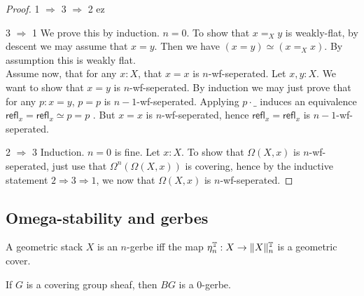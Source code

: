 \documentclass{article}
\newcommand{\refl}{\mathsf{refl}}
\begin{document}
\begin{proof}
	
	\item [1 $\Rightarrow$ 3 $\Rightarrow$ 2] ez

	\item [3 $\Rightarrow$ 1] We prove this by induction. $n = 0$. To show that $x =_{X} y$ is weakly-flat, by descent we may assume that $x = y$. Then we have $(x = y) \simeq (x =_{X} x)$. By assumption this is weakly flat. \\
	Assume now, that for any $x : X$, that $x = x$ is $n$-wf-seperated. Let $x, y : X$. We want to show that $x = y$ is $n$-wf-seperated. By induction we may just prove that for any $p : x = y$, $p = p$ is $n-1$-wf-seperated. Applying $p \cdot \_$ induces an equivalence $\refl_x = \refl_x \simeq p = p$ . But $x = x$ is $n$-wf-seperated, hence $\refl_x = \refl_x$ is $n-1$-wf-seperated.
	\item [2 $\Rightarrow$ 3] Induction. $n=0$ is fine. 
	Let $x : X$. To show that $\Omega(X,x)$ is $n$-wf-seperated, just use that $\Omega^n(\Omega(X,x))$ is covering, hence by the inductive statement $2 \Rightarrow 3 \Rightarrow 1$, we now that $\Omega(X,x)$ is $n$-wf-seperated.
\end{proof}
\subsection{Omega-stability and gerbes}
\begin{definition}
	A geometric stack $X$ is an $n$-gerbe iff the map $\eta_n^{\mathbb{T}} : X \to \|X\|_n^{\mathbb{T}}$ is a geometric cover.
\end{definition}
\begin{example}
	If $G$ is a covering group sheaf, then $BG$ is a 0-gerbe.
\end{example}
\end{document}
